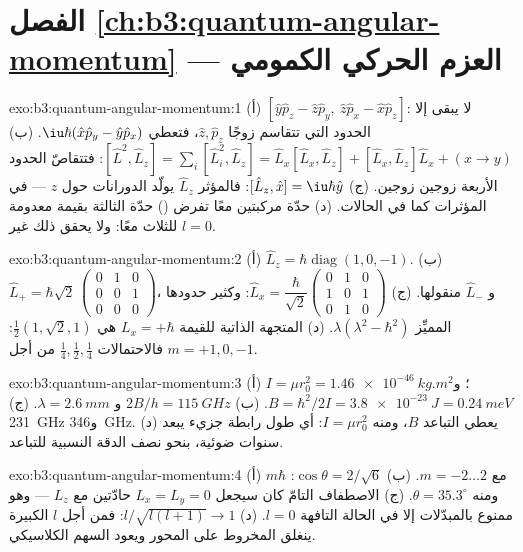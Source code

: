 \section*{الفصل \ref{ch:b3:quantum-angular-momentum} --- العزم الحركي الكمومي}

\begin{solution}{exo:b3:quantum-angular-momentum:1}
(أ) $[\hat y\hat p_z - \hat z\hat p_y,\ \hat z\hat p_x - \hat x\hat
p_z]$: لا يبقى إلا الحدود التي تتقاسم زوجًا $\hat z, \hat p_z$،
فتعطي $\iu\hbar(\hat x\hat p_y - \hat y\hat p_x)$. (ب) $[\hat
L^2, \hat L_z] = \sum_i[\hat L_i^2, \hat L_z] = \hat L_x[\hat L_x,
\hat L_z] + [\hat L_x, \hat L_z]\hat L_x + (x \to y)$: فتتقاصّ الحدود
الأربعة زوجين زوجين. (ج) $[\hat L_z, \hat x] = \iu\hbar\hat y$:
فالمؤثر $\hat L_z$ يولّد الدورانات حول $z$ --- في المؤثرات كما في
الحالات. (د) حدّة مركبتين معًا تفرض ()
حدّة الثالثة بقيمة معدومة للثلاث معًا:
ولا يحقق ذلك غير $l = 0$.
\end{solution}

\begin{solution}{exo:b3:quantum-angular-momentum:2}
(أ) $\hat L_z = \hbar\operatorname{diag}(1, 0, -1)$. (ب) $\hat L_+ =
\hbar\sqrt2\,\begin{pmatrix}0&1&0\\0&0&1\\0&0&0
\end{pmatrix}$، و $\hat L_-$ منقولها. (ج) $\hat L_x =
\dfrac{\hbar}{\sqrt2}\begin{pmatrix}0&1&0\\1&0&1\\0&1&0
\end{pmatrix}$: وكثير حدودها المميِّز $\lambda(\lambda^2 -
\hbar^2)$. (د) المتجهة الذاتية للقيمة $L_x = +\hbar$ هي $\tfrac12(1,
\sqrt2, 1)$: فالاحتمالات $\tfrac14, \tfrac12, \tfrac14$ من أجل $m =
+1, 0, -1$.
\end{solution}

\begin{solution}{exo:b3:quantum-angular-momentum:3}
(أ) $I = \mu r_0^2 = \qty{1.46e-46}{kg.m^2}$؛ و $B = \hbar^2/2I =
\qty{3.8e-23}{J} = \qty{0.24}{meV}$. (ب) $2B/h = \qty{115}{GHz}$ و
$\lambda = \qty{2.6}{mm}$. (ج) \qty{231}{GHz} و\qty{346}{GHz}.
(د) يعطي التباعد $B$، ومنه $I = \mu r_0^2$: أي طول رابطة
جزيء يبعد سنوات ضوئية، بنحو نصف الدقة النسبية
للتباعد.
\end{solution}

\begin{solution}{exo:b3:quantum-angular-momentum:4}
(أ) $m\hbar$ مع $m = -2 \dots 2$. (ب) $\cos\theta = 2/\sqrt6$:
ومنه $\theta = 35.3^\circ$. (ج) الاصطفاف التامّ كان سيجعل $L_x = L_y
= 0$ حادّتين مع $L_z$ --- وهو ممنوع بالمبدّلات
إلا في الحالة التافهة $l = 0$. (د) $l/\sqrt{l(l+1)} \to 1$: فمن أجل
$l$ الكبيرة ينغلق المخروط على المحور ويعود السهم الكلاسيكي.
\end{solution}

